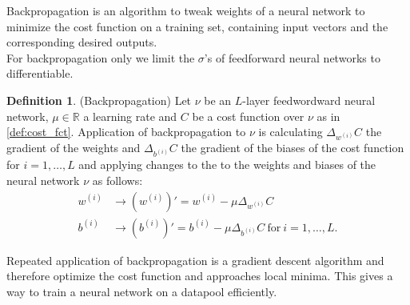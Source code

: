 \documentclass{article}
\theoremstyle{definition}
\newtheorem{definition}[theorem]{Definition}
\begin{document}
Backpropagation is an algorithm to tweak weights of a neural network to minimize the cost function on a training set, containing input vectors and the corresponding desired outputs. \\
For backpropagation only we limit the $\sigma$'s of feedforward neural networks to differentiable.

\begin{definition}(Backpropagation)
Let $\nu$ be an $L$-layer feedwordward neural network, $\mu \in \mathbb{R}$ a learning rate and $C$ be a cost function over $\nu$ as in \ref{def:cost_fct}. Application of backpropagation to $\nu$ is calculating $\Delta_{w^{(i)}} C$ the gradient of the weights and $\Delta_{b^{(i)}} C$ the gradient of the biases of the cost function for $i = 1, \dots , L$ and applying changes to the to the weights and biases of the neural network $\nu$ as follows:
\begin{align*}
w^{(i)} &\to (w^{(i)})' = w^{(i)}-\mu \Delta_{w^{(i)}} C \\
b^{(i)} &\to (b^{(i)})' = b^{(i)}-\mu \Delta_{b^{(i)}} C \ \text{for} \ i = 1, \dots, L. 
\end{align*}
\end{definition}

Repeated application of backpropagation is a gradient descent algorithm and therefore optimize the cost function and approaches local minima. This gives a way to train a neural network on a datapool efficiently.
\end{document}
